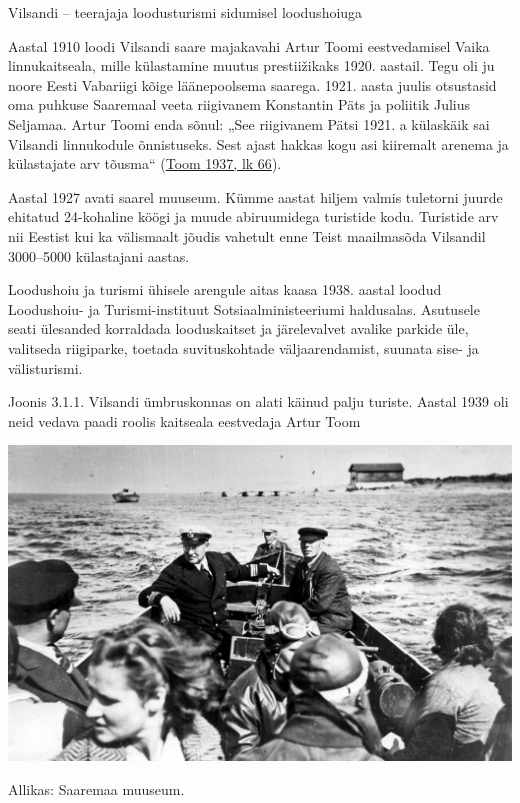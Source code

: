 \documentclass[estonian,]{article}
\begin{document}
Vilsandi -- teerajaja loodusturismi sidumisel loodushoiuga

Aastal 1910 loodi Vilsandi saare majakavahi Artur Toomi eestvedamisel Vaika linnukaitseala, mille külastamine muutus prestiižikaks 1920. aastail. Tegu oli ju noore Eesti Vabariigi kõige läänepoolsema saarega. 1921. aasta juulis otsustasid oma puhkuse Saaremaal veeta riigivanem Konstantin Päts ja poliitik Julius Seljamaa. Artur Toomi enda sõnul: „See riigivanem Pätsi 1921. a külaskäik sai Vilsandi linnukodule õnnistuseks. Sest ajast hakkas kogu asi kiiremalt arenema ja külastajate arv tõusma`` (\protect\hyperlink{Toom1937}{Toom 1937, lk 66}).

Aastal 1927 avati saarel muuseum. Kümme aastat hiljem valmis tuletorni juurde ehitatud 24-kohaline köögi ja muude abiruumidega turistide kodu. Turistide arv nii Eestist kui ka välismaalt jõudis vahetult enne Teist maailmasõda Vilsandil 3000--5000 külastajani aastas.

Loodushoiu ja turismi ühisele arengule aitas kaasa 1938. aastal loodud Loodushoiu- ja Turismi-instituut Sotsiaalministeeriumi haldusalas. Asutusele seati ülesanded korraldada looduskaitset ja järelevalvet avalike parkide üle, valitseda riigiparke, toetada suvituskohtade väljaarendamist, suunata sise- ja välisturismi.

{Joonis 3.1.1.} Vilsandi ümbruskonnas on alati käinud palju turiste. Aastal 1939 oli neid vedava paadi roolis kaitseala eestvedaja Artur Toom

\begin{center}\includegraphics[width=0.9\linewidth]{figures/3-chapter/fig311} \end{center}

\begin{imgsource}
{Allikas:} Saaremaa muuseum.
\end{imgsource}
\end{document}
